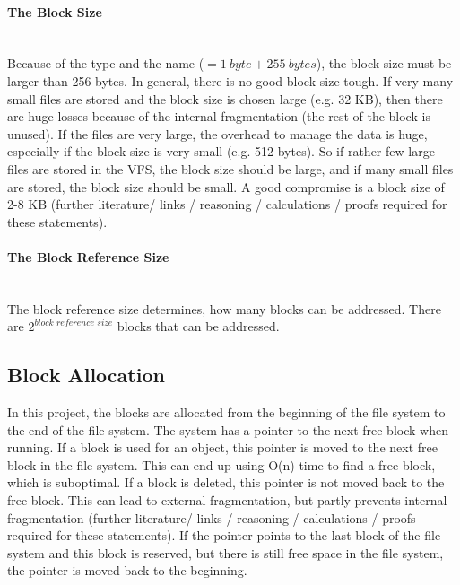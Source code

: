 \documentclass[JCDReport.tex]{subfiles}
\begin{document}
\paragraph{The Block Size} ~\\

\noindent Because of the type and the name ($ = 1\ byte + 255\ bytes$), the block size must be larger than 256 bytes. In general, there is no good block size tough. If very many small files are stored and the block size is chosen  large (e.g. 32 KB), then there are huge losses because of the internal fragmentation (the rest of the block is unused). If the files are very large, the overhead to manage the data is huge, especially if the block size is very small (e.g. 512 bytes). So if rather few large files are stored in the VFS, the block size should be large, and if many small files are stored, the block size should be small. A good compromise is a block size of 2-8 KB (further literature/ links / reasoning / calculations / proofs required for these statements).

\paragraph{The Block Reference Size} ~\\

\noindent The block reference size determines, how many blocks can be addressed. There are $2^{block\_reference\_size}$ blocks that can be addressed.

\subsection{Block Allocation}

In this project, the blocks are allocated from the beginning of the file system to the end of the file system. The system has a pointer to the next free block when running. If a block is used for an object, this pointer is moved to the next free block in the file system. This can end up using O(n) time to find a free block, which is suboptimal. If a block is deleted, this pointer is not moved back to the free block. This can lead to external fragmentation, but partly prevents internal fragmentation (further literature/ links / reasoning / calculations / proofs required for these statements). If the pointer points to the last block of the file system and this block is reserved, but there is still free space in the file system, the pointer is moved back to the beginning.
\end{document}
